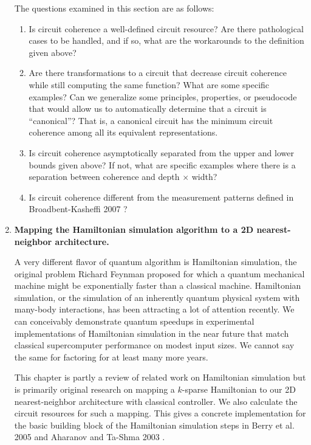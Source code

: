 \documentclass[]{article}
\theoremstyle{plain} \newtheorem{lemma}{Lemma}
\begin{document}
\begin{enumerate}
The questions examined in this section are as follows:

\begin{enumerate}
\item
Is circuit coherence a well-defined circuit resource? Are there pathological
cases to be handled, and if so, what are the workarounds to the definition
given above?

\item
Are there transformations to a circuit that decrease circuit coherence while
still computing the same function? What are some specific examples? Can we
generalize some principles, properties, or pseudocode that would allow us to
automatically determine that a circuit is ``canonical''?
That is, a canonical circuit has the minimum circuit coherence among
all its equivalent representations.

\item
Is circuit coherence asymptotically separated from the upper and lower bounds
given above? If not, what are specific examples where there is a separation
between coherence and depth $\times$ width? 

\item
Is circuit coherence different from the measurement patterns defined in
Broadbent-Kasheffi 2007 \cite{Broadbent2007} ?

\end{enumerate}


\item
\textbf{Mapping the Hamiltonian simulation algorithm to a 2D nearest-neighbor
architecture.}

A very different flavor of quantum algorithm is Hamiltonian simulation, the
original problem Richard Feynman proposed for which a quantum mechanical
machine might be exponentially faster than a classical machine. Hamiltonian
simulation, or the simulation of an inherently quantum physical system
with many-body interactions, has been attracting a lot of attention recently.
We can
conceivably demonstrate quantum speedups in experimental implementations
of Hamiltonian simulation in the
near future that match classical supercomputer performance on modest input
sizes. We cannot say the same for factoring for at least many more years.

This chapter is partly a review of related work on Hamiltonian simulation
but is primarily original research on mapping a $k$-sparse Hamiltonian
to our 2D
nearest-neighbor architecture with classical controller. We also calculate
the circuit resources for such a mapping. This gives a concrete
implementation for the basic building block of the Hamiltonian simulation
steps in Berry et al. 2005 \cite{Berry2006} and Aharanov and Ta-Shma
2003 \cite{Aharonov2003}.


\end{enumerate}
\end{document}
